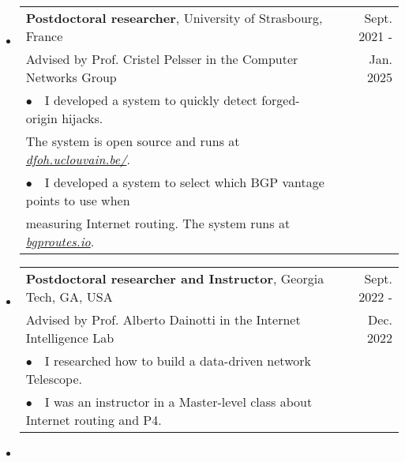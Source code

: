 \documentclass[letterpaper,11pt]{article}
\begin{document}
\begin{itemize}[label={},leftmargin=3mm]
\setlength\itemsep{1.5em}

\item

    \begin{tabular*}{6.5in}{l@{\cftdotfill{\cftsecdotsep}\extracolsep{\fill}}r}
    		\sffamily \textbf{Postdoctoral researcher}, University of Strasbourg, France & \sffamily Sept. 2021 -\\
    		\sffamily Advised by Prof. Cristel Pelsser in the Computer Networks Group & \sffamily Jan. 2025\\
			\sffamily $\bullet$~~I developed a system to quickly detect forged-origin hijacks. & \\
			\sffamily The system is open source and runs at \href{https://dfoh.uclouvain.be/}{\textit{dfoh.uclouvain.be/}}. & \\
			\sffamily $\bullet$~~I developed a system to select which BGP vantage points to use when & \\
			\sffamily  measuring Internet routing. The system runs at \href{https://bgproutes.io}{\textit{bgproutes.io}}. & \\

    \end{tabular*}\vspace{-10pt}

\item

    \begin{tabular*}{6.5in}{l@{\cftdotfill{\cftsecdotsep}\extracolsep{\fill}}r}
    		\sffamily \textbf{Postdoctoral researcher and Instructor}, Georgia Tech, GA, USA & \sffamily Sept. 2022 -\\
    		\sffamily Advised by Prof. Alberto Dainotti in the Internet Intelligence Lab & \sffamily Dec. 2022\\
			\sffamily $\bullet$~~I researched how to build a data-driven network Telescope. & \\
			\sffamily $\bullet$~~I was an instructor in a Master-level class about Internet routing and P4.  & \\

    \end{tabular*}\vspace{-10pt}

\item


\end{itemize}
\end{document}
